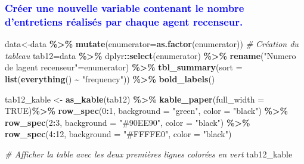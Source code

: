 \documentclass[
]{article}
\newenvironment{Shaded}{\begin{snugshade}}{\end{snugshade}}
\newcommand{\AttributeTok}[1]{\textcolor[rgb]{0.13,0.29,0.53}{#1}}
\newcommand{\CommentTok}[1]{\textcolor[rgb]{0.56,0.35,0.01}{\textit{#1}}}
\newcommand{\ConstantTok}[1]{\textcolor[rgb]{0.56,0.35,0.01}{#1}}
\newcommand{\DecValTok}[1]{\textcolor[rgb]{0.00,0.00,0.81}{#1}}
\newcommand{\FunctionTok}[1]{\textcolor[rgb]{0.13,0.29,0.53}{\textbf{#1}}}
\newcommand{\NormalTok}[1]{#1}
\newcommand{\OtherTok}[1]{\textcolor[rgb]{0.56,0.35,0.01}{#1}}
\newcommand{\SpecialCharTok}[1]{\textcolor[rgb]{0.81,0.36,0.00}{\textbf{#1}}}
\newcommand{\StringTok}[1]{\textcolor[rgb]{0.31,0.60,0.02}{#1}}
\begin{document}
\hfill\break

\textcolor{blue}{\subsubsection{Créer une nouvelle variable contenant le nombre d'entretiens réalisés par chaque agent recenseur.}}

\hfill\break

\begin{Shaded}
\begin{Highlighting}[]
\NormalTok{data}\OtherTok{\textless{}{-}}\NormalTok{data }\SpecialCharTok{\%\textgreater{}\%} 
          \FunctionTok{mutate}\NormalTok{(}\AttributeTok{enumerator=}\FunctionTok{as.factor}\NormalTok{(enumerator))}
\CommentTok{\# Création du tableau}
\NormalTok{tab12}\OtherTok{=}\NormalTok{data }\SpecialCharTok{\%\textgreater{}\%} 
\NormalTok{    dplyr}\SpecialCharTok{::}\FunctionTok{select}\NormalTok{(enumerator) }\SpecialCharTok{\%\textgreater{}\%} 
            \FunctionTok{rename}\NormalTok{(}\StringTok{"Numero de l\textquotesingle{}agent recenseur"}\OtherTok{=}\NormalTok{enumerator) }\SpecialCharTok{\%\textgreater{}\%} 
                \FunctionTok{tbl\_summary}\NormalTok{(}\AttributeTok{sort =} \FunctionTok{list}\NormalTok{(}\FunctionTok{everything}\NormalTok{() }\SpecialCharTok{\textasciitilde{}} \StringTok{"frequency"}\NormalTok{)) }\SpecialCharTok{\%\textgreater{}\%} \FunctionTok{bold\_labels}\NormalTok{()}

\NormalTok{tab12\_kable }\OtherTok{\textless{}{-}} \FunctionTok{as\_kable}\NormalTok{(tab12) }\SpecialCharTok{\%\textgreater{}\%}  
   \FunctionTok{kable\_paper}\NormalTok{(}\AttributeTok{full\_width =} \ConstantTok{TRUE}\NormalTok{)}\SpecialCharTok{\%\textgreater{}\%}
  \FunctionTok{row\_spec}\NormalTok{(}\DecValTok{0}\SpecialCharTok{:}\DecValTok{1}\NormalTok{, }\AttributeTok{background =} \StringTok{"green"}\NormalTok{, }\AttributeTok{color =} \StringTok{"black"}\NormalTok{) }\SpecialCharTok{\%\textgreater{}\%}
  \FunctionTok{row\_spec}\NormalTok{(}\DecValTok{2}\SpecialCharTok{:}\DecValTok{3}\NormalTok{, }\AttributeTok{background =} \StringTok{"\#90EE90"}\NormalTok{, }\AttributeTok{color =} \StringTok{"black"}\NormalTok{) }\SpecialCharTok{\%\textgreater{}\%} 
  \FunctionTok{row\_spec}\NormalTok{(}\DecValTok{4}\SpecialCharTok{:}\DecValTok{12}\NormalTok{, }\AttributeTok{background =} \StringTok{"\#FFFFE0"}\NormalTok{, }\AttributeTok{color =} \StringTok{"black"}\NormalTok{)}

\CommentTok{\# Afficher la table avec les deux premières lignes colorées en vert}
\NormalTok{tab12\_kable}
\end{Highlighting}
\end{Shaded}
\end{document}
